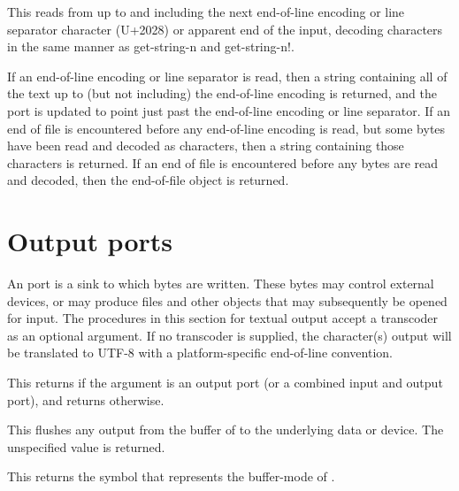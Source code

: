 \begin{entry}{%
}
   
This reads from  up to and including the next
end-of-line encoding or line separator character (U+2028) or apparent
end of the input, decoding characters in the same manner as {\cf
  get-string-n} and {\cf get-string-n!}.
   
If an end-of-line encoding or line separator is read, then a string
containing all of the text up to (but not including) the end-of-line
encoding is returned, and the port is updated to point just past the
end-of-line encoding or line separator. If an end of file is
encountered before any end-of-line encoding is read, but some bytes
have been read and decoded as characters, then a string containing
those characters is returned. If an end of file is encountered before
any bytes are read and decoded, then the end-of-file object is
returned.
\end{entry}

\section{Output ports}

An port is a sink to which bytes are written. These bytes may control
external devices, or may produce files and other objects that may
subsequently be opened for input.  The procedures in this section for
textual output accept a transcoder as an optional argument.  If no
transcoder is supplied, the character(s) output will be translated to
UTF-8 with a platform-specific end-of-line convention.

\begin{entry}{%
}
   
This returns \schtrue{} if the argument is an output port (or a
combined input and output port), and returns \schfalse{} otherwise.
\end{entry}   

\begin{entry}{%
}
   
This flushes any output from the buffer of  to the
underlying data or device. The unspecified value is returned.
\end{entry}

\begin{entry}{%
}
   
This returns the symbol that represents the buffer-mode of
.
\end{entry}


